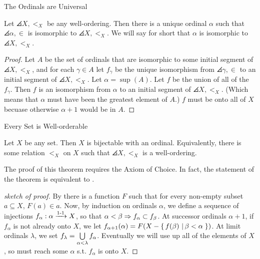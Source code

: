 \documentclass[pdf,final]{prosper}
\begin{document}
\begin{slide}{The Ordinals are Universal}
\begin{theorem}
Let $\angles{X,<_X}$	be any well-ordering. Then there is a unique ordinal
$\alpha$ such that $\angles{\alpha,\in}$  is isomorphic to $\angles{X,<_X}$.
We will say for short that $\alpha$ is isomorphic to $\angles{X,<_X}$.
\end{theorem}
\begin{proof}
Let $A$ be the set of ordinals that are isomorphic to some initial segment of
$\angles{X,<_X}$, and for each $\gamma\in A$ let $f_{\gamma}$ be the unique
isomorphism from $\angles{\gamma,\in}$ to an initial segment of
$\angles{X,<_X}$. Let $\alpha=\sup(A)$. Let $f$ be the union of all of the
$f_{\gamma}$. Then $f$ is an isomorphism from $\alpha$ to an initial segment of
$\angles{X,<_X}$. (Which means that $\alpha$ must have been the greatest
element of $A$.) $f$ must be onto all of $X$ becuase otherwise $\alpha+1$ would
be in $A$.
\end{proof}
\end{slide}

\begin{slide}{Every Set is Well-orderable}
\begin{theorem}
Let $X$ be any set. Then $X$ is bijectable with an ordinal. Equivalently, there
is some relation $<_X$ on $X$ such that $\angles{X,<_X}$ is a well-ordering.
\end{theorem}


\begin{remark}
The proof of this theorem requires the Axiom of Choice. In fact, the statement
of the theorem is equivalent to \AC.
\end{remark}


\begin{proof}[sketch of proof]
By \AC there is a function $F$ such that for every non-empty subset $a\subseteq
X$, $F(a)\in a$.
Now, by induction on ordinals $\alpha$, we define a sequence of injections
$f_{\alpha}:\alpha\xrightarrow{\text{1-1}} X$, so that $\alpha<\beta\Rightarrow f_{\alpha}\subset
f_{\beta}$. At successor ordinals $\alpha+1$, if $f_{\alpha}$ is not already
onto $X$, we let
$f_{\alpha+1}(\alpha)=F(X-\left\{ \, f(\beta) \, \left| \, \beta<\alpha \, \right.\right\})$. At limit ordinals $\lambda$,
we set $f_{\lambda}=\bigcup\limits_{\alpha<\lambda}f_{\alpha}$. Eventually we will use up
all of the elements of $X$, so must reach some $\alpha$ s.t.
$f_{\alpha}$ is onto $X$. 
\end{proof}
\end{slide}
\end{document}
